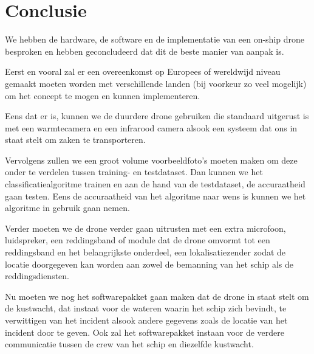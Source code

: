 
\chapter{Conclusie}
\label{ch:conclusie}


We hebben de hardware, de software en de implementatie van een on-ship drone besproken en hebben geconcludeerd dat dit de beste manier van aanpak is. 

Eerst en vooral zal er een overeenkomst op Europees of wereldwijd niveau gemaakt moeten worden met verschillende landen (bij voorkeur zo veel mogelijk) om het concept te mogen en kunnen implementeren. 

Eens dat er is, kunnen we de duurdere drone gebruiken die standaard uitgerust is met een warmtecamera en een infrarood camera alsook een systeem dat ons in staat stelt om zaken te transporteren. 

Vervolgens zullen we een groot volume voorbeeldfoto's moeten maken om deze onder te verdelen tussen training- en testdataset. Dan kunnen we het classificatiealgoritme trainen en aan de hand van de testdataset, de accuraatheid gaan testen. Eens de accuraatheid van het algoritme naar wens is kunnen we het algoritme in gebruik gaan nemen. 

Verder moeten we de drone verder gaan uitrusten met een extra microfoon, luidspreker, een reddingsband of module dat de drone omvormt tot een reddingsband en het belangrijkste onderdeel, een lokalisatiezender zodat de locatie doorgegeven kan worden aan zowel de bemanning van het schip als de reddingsdiensten. 

Nu moeten we nog het softwarepakket gaan maken dat de drone in staat stelt om de kustwacht, dat instaat voor de wateren waarin het schip zich bevindt, te verwittigen van het incident alsook andere gegevens zoals de locatie van het incident door te geven. Ook zal het softwarepakket instaan voor de verdere communicatie tussen de crew van het schip en diezelfde kustwacht.

